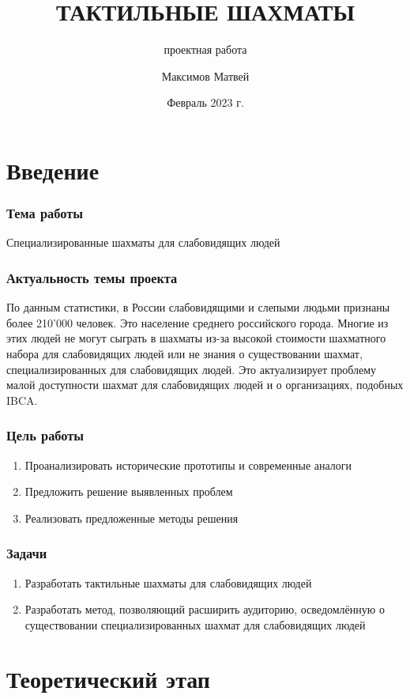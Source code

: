 \documentclass[notes=only]{beamer}
\title[тактильные шахматы]{ТАКТИЛЬНЫЕ ШАХМАТЫ}
\subtitle{проектная работа}
\author{Максимов Матвей}
\institute[МБОУ СОШ №73]{%
    Муниципальное бюджетное общеобразовательное учреждение\\
    <<Средняя общеобразовательная школа №73>>\\
    11 А класс}
\date{Февраль 2023 г.}
\begin{document}
\frame{\titlepage}

\section{Введение}

\begin{frame}
    \frametitle{Тема работы}
    \begin{center}
        Специализированные шахматы для слабовидящих людей
    \end{center}
\end{frame}

\begin{frame}
    \frametitle{Актуальность темы проекта}
    По данным статистики, в России слабовидящими и слепыми людьми признаны
    более 210'000 человек. Это население среднего российского города. Многие из
    этих людей не могут сыграть в шахматы из-за высокой стоимости шахматного
    набора для слабовидящих людей или не знания о существовании шахмат,
    специализированных для слабовидящих людей. Это актуализирует проблему малой
    доступности шахмат для слабовидящих людей и о организациях, подобных IBCA\@.
\end{frame}

\begin{frame}
    \frametitle{Цель работы}
    \begin{enumerate}
        \item Проанализировать исторические прототипы и современные аналоги
        \item Предложить решение выявленных проблем
        \item Реализовать предложенные методы решения
    \end{enumerate}
\end{frame}

\begin{frame}
    \frametitle{Задачи}
    \begin{enumerate}
        \item Разработать тактильные шахматы для слабовидящих людей
        \item Разработать метод, позволяющий расширить аудиторию, осведомлённую
            о существовании специализированных шахмат для слабовидящих людей
    \end{enumerate}
\end{frame}

\section{Теоретический этап}
\end{document}
